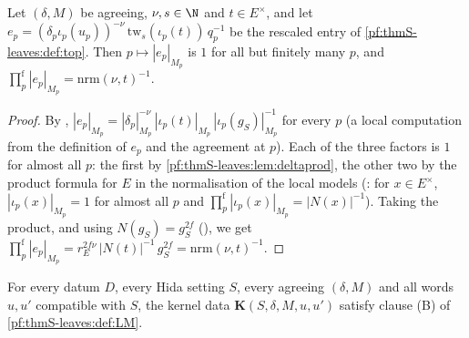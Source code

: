 \begin{lemma}\label{pf:thmS-leaves:lem:modnorm}
Let $(\delta,M)$ be agreeing, $\nu,s\in\N$ and $t\in E^\times$, and let $e_p=(\delta_p\iota_p(u_p))^{-\nu}\,\mathrm{tw}_s(\iota_p(t))\,q_p^{-1}$
be the rescaled entry of \cref{pf:thmS-leaves:def:top}. Then $p\mapsto|e_p|_{M_p}$ is $1$ for all but finitely many $p$, and
$\prod^{\mathrm f}_p|e_p|_{M_p}=\mathrm{nrm}(\nu,t)^{-1}$.
\end{lemma}

\begin{proof}
By , $|e_p|_{M_p}=|\delta_p|_{M_p}^{-\nu}\,|\iota_p(t)|_{M_p}\,|\iota_p(g_S)|_{M_p}^{-1}$ for every
$p$ (a local computation from the definition of $e_p$ and the agreement at $p$). Each of the three factors is $1$ for almost all $p$: the first by
\cref{pf:thmS-leaves:lem:deltaprod}, the other two by the product formula for $E$ in the normalisation of the local models
(: for $x\in E^\times$, $|\iota_p(x)|_{M_p}=1$ for almost all $p$ and
$\prod^{\mathrm f}_p|\iota_p(x)|_{M_p}=|N(x)|^{-1}$). Taking the product, and using $N(g_S)=g_S^{2f}$
(), we get $\prod^{\mathrm f}_p|e_p|_{M_p}=r_E^{2f\nu}\,|N(t)|^{-1}\,g_S^{2f}=\mathrm{nrm}(\nu,t)^{-1}$.
\end{proof}

\begin{proposition}[Clause (B)]\label{pf:thmS-leaves:prop:clauseB}
For every datum $D$, every Hida setting $S$, every agreeing $(\delta,M)$ and all words $u,u'$ compatible with $S$, the kernel data
$\mathbf K(S,\delta,M,u,u')$ satisfy clause (B) of \cref{pf:thmS-leaves:def:LM}.
\end{proposition}

